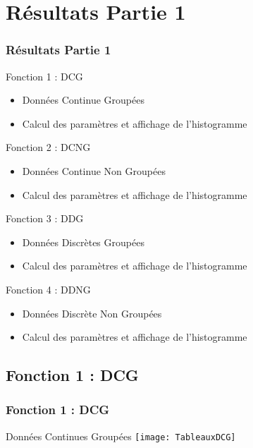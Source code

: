 \documentclass{beamer}
\begin{document}
\section{Résultats Partie 1}
\begin{frame}[label=Résultats]
\frametitle{Résultats Partie 1}
\begin{beamerboxesrounded}[shadow=true]{Fonction 1 : DCG}
	\begin{itemize}
			\item \small Données Continue Groupées
			\item \small Calcul des paramètres et affichage de l'histogramme
	\end{itemize}
\end{beamerboxesrounded}

\begin{beamerboxesrounded}[shadow=true]{Fonction 2 : DCNG}
	\begin{itemize}
			\item \small Données Continue Non Groupées
			\item \small Calcul des paramètres et affichage de l'histogramme
	\end{itemize}
\end{beamerboxesrounded}

\begin{beamerboxesrounded}[shadow=true]{Fonction 3 : DDG}
	\begin{itemize}
			\item \small Données Discrètes Groupées
			\item \small Calcul des paramètres et affichage de l'histogramme
	\end{itemize}
\end{beamerboxesrounded}

\begin{beamerboxesrounded}[shadow=true]{Fonction 4 : DDNG}
	\begin{itemize}
			\item \small Données Discrète Non Groupées
			\item \small Calcul des paramètres et affichage de l'histogramme
	\end{itemize}
\end{beamerboxesrounded}
\end{frame}

\subsection{ Fonction 1 : DCG}
\begin{frame}[label=Fonction 1 : DCG]
\frametitle{Fonction 1 : DCG}
\begin{beamerboxesrounded}[shadow=true]{Données Continues Groupées}
\texttt{[image: TableauxDCG]}\\
\end{beamerboxesrounded}
\end{frame}
\end{document}
